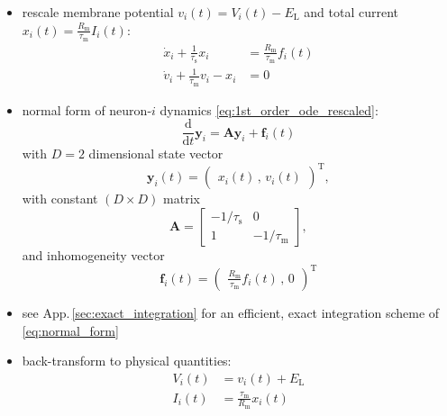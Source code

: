 \documentclass[10pt,a4paper,twoside,american]{article}
\theoremstyle{definitionstyle}
\newcommand{\diff}{\ensuremath{\text{d}}}
\newcommand{\RM}{R_\text{m}}
\newcommand{\tauM}{\tau_\text{m}}
\newcommand{\tauS}{\tau_\text{s}}
\begin{document}
\begin{itemize}
\item rescale membrane potential $v_i(t) = V_i(t)-E_\text{L}$ and total
  current $\displaystyle{}x_{i}(t) = \frac{\RM}{\tauM}I_{i}(t)$:
  \begin{equation}
    \label{eq:1st_order_ode_rescaled}
    \begin{aligned}
      \dot{x}_{i} + \frac{1}{\tauS} x_{i} &= \frac{\RM}{\tauM} f_{i}(t)\\
      \dot{v}_{i} + \frac{1}{\tauM} v_{i} -  x_{i}  &= 0
    \end{aligned}
  \end{equation} 
\item normal form of neuron-$i$ dynamics \eqref{eq:1st_order_ode_rescaled}:
  \begin{equation}
    \label{eq:normal_form}
    \frac{\diff}{\diff t} \bm{y}_i = \bm{A} \bm{y}_i + \bm{f}_i(t)
  \end{equation}
  with $D=2$ dimensional state vector
  \begin{equation}
    \label{eq:normal_form_state_vector}    
    \bm{y}_i(t) = 
    \begin{pmatrix}
      x_{i}(t)   \,,\,
      v_{i}(t)       
    \end{pmatrix}^\text{T},
  \end{equation}
  with constant $(D\times{}D)$ matrix
  \begin{equation}
    \label{eq:normal_form_coupling_matrix}    
    \bm{A} = 
    \begin{bmatrix}
      -1/\tauS & 0\\
      1        & -1/\tauM  
    \end{bmatrix},	   
  \end{equation}
  and inhomogeneity vector
  \begin{equation}
    \label{eq:normal_form_inhomogeneity}        
    \bm{f}_i(t) = 
    \begin{pmatrix}\displaystyle
      \frac{\RM}{\tauM} f_{i}(t)     \,,\,
      0               
    \end{pmatrix}^\text{T}
  \end{equation}
  \citep[see Sec.\,3.2.2 in][]{Rotter99_381}
\item see App.\,\ref{sec:exact_integration} for an efficient, exact integration scheme of \eqref{eq:normal_form}
\item back-transform to physical quantities:
  \begin{equation}
    \begin{aligned}
      V_i(t)      & = v_i(t)+E_\text{L}\\
      I_{i}(t) & = \frac{\tauM}{\RM}x_{i}(t)
    \end{aligned}
  \end{equation}
\end{itemize}
\end{document}
